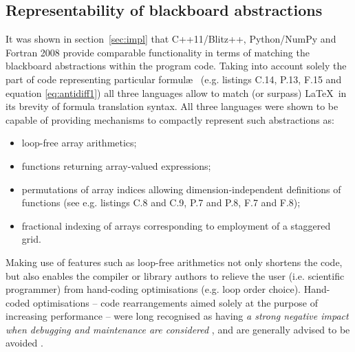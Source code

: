 \documentclass[twocolumn]{article}
\begin{document}
  \subsection{Representability of blackboard abstractions}

  It was shown in section~\ref{sec:impl} that C++11/Blitz++, Python/NumPy and Fortran 2008
    provide comparable functionality in terms of matching the blackboard abstractions
    within the program code.
  Taking into account solely the part of code representing particular formul\ae~
    (e.g. listings C.14, P.13, F.15 and equation \ref{eq:antidiff1}) all three
    languages allow to match (or surpass) \LaTeX~in its brevity of formula translation syntax.
  All three languages were shown to be capable of providing mechanisms to compactly represent such abstractions as:
  \begin{itemize}
    \item{loop-free array arithmetics;}
    \item{functions returning array-valued expressions;}
    \item{permutations of array indices allowing dimension-independent definitions
      of functions (see e.g. listings C.8 and C.9, P.7 and P.8, F.7 and F.8);}
    \item{fractional indexing of arrays corresponding to employment of a staggered grid.}
  \end{itemize}
  
  Making use of features such as loop-free arithmetics not only shortens the code,
    but also enables the compiler or library authors to relieve the user (i.e. scientific programmer)
    from hand-coding optimisations (e.g. loop order choice).
  Hand-coded optimisations -- code rearrangements aimed solely at the purpose of increasing performance --
    were long recognised as having {\em a strong negative impact when debugging
    and maintenance are considered} \citep{Knuth_1974},
    and are generally advised to be avoided \citep[e.g.][section 3.12]{bib_CERNcpp}.
\end{document}
